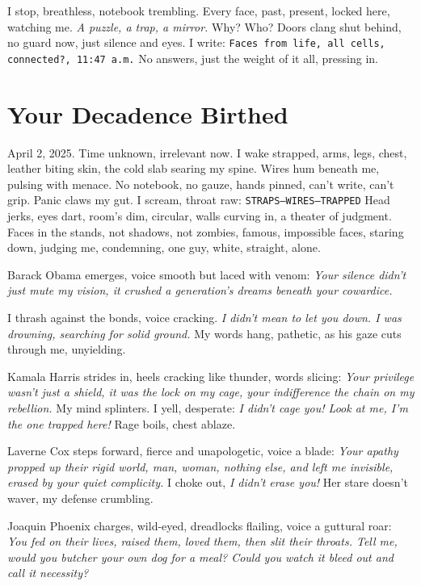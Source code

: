 \documentclass[12pt]{article}
\newcommand{\note}[1]{\texttt{#1}}
\begin{document}
{I stop, breathless, notebook trembling. Every face, past, present, locked here, watching me. \textit{A puzzle, a trap, a mirror.} Why? Who? Doors clang shut behind, no guard now, just silence and eyes. I write: \note{Faces from life, all cells, connected?, 11:47 a.m.} No answers, just the weight of it all, pressing in.

\section{Your Decadence Birthed}

April 2, 2025. Time unknown, irrelevant now. I wake strapped, arms, legs, chest, leather biting skin, the cold slab searing my spine. Wires hum beneath me, pulsing with menace. No notebook, no gauze, hands pinned, can’t write, can’t grip. Panic claws my gut. I scream, throat raw: \note{STRAPS—WIRES—TRAPPED} Head jerks, eyes dart, room’s dim, circular, walls curving in, a theater of judgment. Faces in the stands, not shadows, not zombies, famous, impossible faces, staring down, judging me, condemning, one guy, white, straight, alone.

Barack Obama emerges, voice smooth but laced with venom: \textit{Your silence didn’t just mute my vision, it crushed a generation’s dreams beneath your cowardice.}

I thrash against the bonds, voice cracking. \textit{I didn’t mean to let you down. I was drowning, searching for solid ground.} My words hang, pathetic, as his gaze cuts through me, unyielding.

Kamala Harris strides in, heels cracking like thunder, words slicing: \textit{Your privilege wasn’t just a shield, it was the lock on my cage, your indifference the chain on my rebellion.} My mind splinters. I yell, desperate: \textit{I didn’t cage you! Look at me, I’m the one trapped here!} Rage boils, chest ablaze.

Laverne Cox steps forward, fierce and unapologetic, voice a blade: \textit{Your apathy propped up their rigid world, man, woman, nothing else, and left me invisible, erased by your quiet complicity.} I choke out, \textit{I didn’t erase you!} Her stare doesn’t waver, my defense crumbling.

Joaquin Phoenix charges, wild-eyed, dreadlocks flailing, voice a guttural roar: \textit{You fed on their lives, raised them, loved them, then slit their throats. Tell me, would you butcher your own dog for a meal? Could you watch it bleed out and call it necessity?}

}
\end{document}
